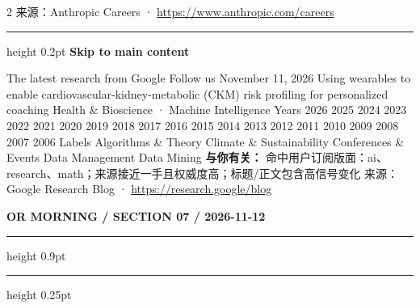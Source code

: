 \documentclass[10.5pt]{ctexart}
\begin{document}
\begin{multicols}{2}
{\footnotesize\color{ormuted} 来源：Anthropic Careers · \url{https://www.anthropic.com/careers}}
\vspace{2mm}
\hrule height 0.2pt
\vspace{2mm}
{\large\bfseries Skip to main content}\par
The latest research from Google Follow us November 11, 2026 Using wearables to enable cardiovascular-kidney-metabolic (CKM) risk profiling for personalized coaching Health \& Bioscience · Machine Intelligence Years 2026 2025 2024 2023 2022 2021 2020 2019 2018 2017 2016 2015 2014 2013 2012 2011 2010 2009 2008 2007 2006 Labels Algorithms \& Theory Climate \& Sustainability Conferences \& Events Data Management Data Mining 
\textbf{与你有关：} 命中用户订阅版面：ai、research、math；来源接近一手且权威度高；标题/正文包含高信号变化
{\footnotesize\color{ormuted} 来源：Google Research Blog · \url{https://research.google/blog}}
\end{multicols}
\newpage
{\small\bfseries OR MORNING / SECTION 07 / 2026-11-12}
\vspace{2mm}
\hrule height 0.9pt
\vspace{1.5mm}
\hrule height 0.25pt
\vspace{4mm}
\end{document}
